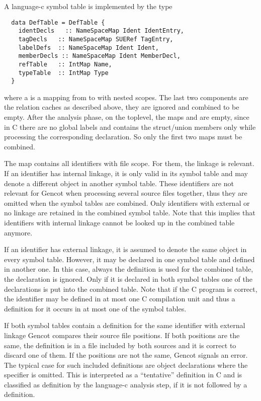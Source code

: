 A language-c symbol table is implemented by the type 
\begin{verbatim}
  data DefTable = DefTable {
    identDecls   :: NameSpaceMap Ident IdentEntry,
    tagDecls   :: NameSpaceMap SUERef TagEntry,
    labelDefs  :: NameSpaceMap Ident Ident,
    memberDecls :: NameSpaceMap Ident MemberDecl,
    refTable   :: IntMap Name,
    typeTable  :: IntMap Type
  }
\end{verbatim}
where a  is a mapping from  to  with nested scopes. The last two components are the 
relation caches as described above, they are ignored and combined to be empty. After the analysis phase, on the toplevel, 
the maps  and  are empty, since in C there are no global labels and 
contains the struct/union members only while processing the corresponding declaration. So only the first two maps must
be combined.

The map  contains all identifiers with file scope. For them, the linkage is relevant. If an identifier has 
internal linkage, it is only valid in its symbol table and may denote a different object in another symbol table. These
identifiers are not relevant for Gencot when processing several source files together, thus they are omitted when the
symbol tables are combined. Only identifiers with external or no linkage are retained in the combined symbol table. Note
that this implies that identifiers with internal linkage cannot be looked up in the combined table anymore.

If an identifier has external linkage, it is assumed to denote the same object in every symbol table. However, it may be
declared in one symbol table and defined in another one. In this case, always the definition is used for the combined
table, the declaration is ignored. Only if it is declared in both symbol tables one of the declarations is put into the
combined table. Note that if the C program is correct, the identifier may be defined in at most one C compilation unit
and thus a definition for it occurs in at most one of the symbol tables. 

If both symbol tables contain a definition for the same identifier with external linkage Gencot compares their source 
file positions. If both positions are the same, the definition is in a file included by both sources and it is correct to
discard one of them. If the positions are not the same, Gencot signals an error. The typical case for such included 
definitions are object declarations where the  specifier is omitted. This is interpreted as a ``tentative''
definition in C and is classified as definition by the language-c analysis step, if it is not followed by a definition.

